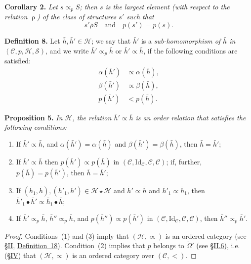 \documentclass[a4paper,oneside,nobib,nofonts,notitlepage,notoc,nols,fleqn,justified]{tufte-book}
\newenvironment{itenv}[1]
  {\phantomsection\par\medskip\noindent\textbf{#1.}\itshape}
  {\par\medskip}
\newenvironment{rmenv}[1]
  {\phantomsection\par\medskip\noindent\textbf{#1.}\rmfamily}
  {\par\medskip}
\newcommand{\CC}{\mathcal{C}}
\newcommand{\HH}{\mathcal{H}}
\renewcommand{\SS}{\mathcal{S}}
\newcommand{\relrho}{\mathrel{\rho}}
\newcommand{\relrhobar}{\mathrel{\bar{\rho}}}
\newcommand{\subs}{\mathrel{\propto}}
\newcommand{\Id}{\mathrm{Id}}
\begin{document}
\begin{itenv}{Corollary 2}
  Let $s\subs_p S$;
  then $s$ is the largest element (with respect to the relation $\relrho$) of the class of structures $s'$ such that
  \[
    s'\relrhobar S
    \quad\text{and}\quad
    p(s') = p(s).
  \]
\end{itenv}

\begin{rmenv}{Definition 8}
\label{definition:8}
  Let $\bar{h},\bar{h}'\in\HH$;
  we say that $\bar{h}'$ is a \emph{sub-homomorphism of $\bar{h}$ in $(\CC,p,\HH,\SS)$}, and we write $\bar{h}'\subs_p\bar{h}$ or $\bar{h}'\subs\bar{h}$, if the following conditions are satisfied:
  \[
    \begin{aligned}
      \alpha(\bar{h}')
      &\subs \alpha(\bar{h}),
    \\\beta(\bar{h}')
      &\subs \beta(\bar{h}),
    \\p(\bar{h}')
      &< p(\bar{h}).
    \end{aligned}
  \]
\end{rmenv}

\begin{itenv}{Proposition 5}
\label{proposition:5}
  In $\HH$, the relation $\bar{h}'\subs\bar{h}$ is an order relation that satisfies the following conditions:
  \begin{enumerate}
    \item[\normalfont(1)]
      If $\bar{h}'\subs\bar{h}$, and $\alpha(\bar{h}')=\alpha(\bar{h})$ and $\beta(\bar{h}')=\beta(\bar{h})$, then $\bar{h}=\bar{h}'$;
    \item[\normalfont(2)]
      If $\bar{h}'\subs\bar{h}$ then $p(\bar{h}')\subs p(\bar{h})$ in $(\CC,\Id_\CC,\CC,\CC)$;
      if, further, $p(\bar{h})=p(\bar{h}')$, then $\bar{h}=\bar{h}'$;
    \item[\normalfont(3)]
      If $(\bar{h}_1,\bar{h}),(\bar{h}'_1,\bar{h}')\in\HH\star\HH$ and $\bar{h}'\subs\bar{h}$ and $\bar{h}'_1\subs\bar{h}_1$, then $\bar{h}'_1\bullet\bar{h}'\subs\bar{h}_1\bullet\bar{h}$;
    \item[\normalfont(4)]
      If $\bar{h}'\subs_p\bar{h}$, $\bar{h}''\subs_p\bar{h}$, and $p(\bar{h}'')\subs p(\bar{h}')$ in $(\CC,\Id_\CC,\CC,\CC)$, then $\bar{h}''\subs_p\bar{h}'$.
  \end{enumerate}
\end{itenv}

\begin{proof}
  Conditions~(1) and (3) imply that $(\HH,\subs)$ is an ordered category (see \hyperref[section:ii]{§II}, \hyperref[definition:18]{Definition~18}).
  Condition~(2) implies that $p$ belongs to $\widetilde{\Omega}'$ (see \hyperref[section:ii.6]{§II.6}), i.e. (\hyperref[section:iv]{§IV}) that $(\HH,\subs)$ is an ordered category over $(\CC,<)$.
\end{proof}
\end{document}
